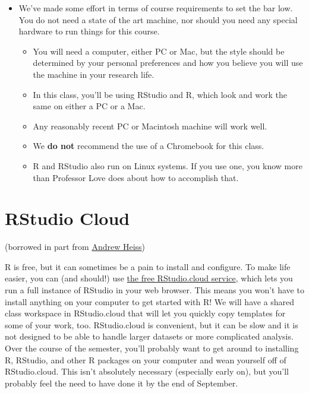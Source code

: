 \documentclass[
]{book}
\providecommand{\tightlist}{%
  \setlength{\itemsep}{0pt}\setlength{\parskip}{0pt}}
\begin{document}
\begin{itemize}
\tightlist
\item
  We've made some effort in terms of course requirements to set the bar low. You do not need a state of the art machine, nor should you need any special hardware to run things for this course.

  \begin{itemize}
  \tightlist
  \item
    You will need a computer, either PC or Mac, but the style should be determined by your personal preferences and how you believe you will use the machine in your research life.
  \item
    In this class, you'll be using RStudio and R, which look and work the same on either a PC or a Mac.
  \item
    Any reasonably recent PC or Macintosh machine will work well.
  \item
    We \textbf{do not} recommend the use of a Chromebook for this class.
  \item
    R and RStudio also run on Linux systems. If you use one, you know more than Professor Love does about how to accomplish that.
  \end{itemize}
\end{itemize}

\hypertarget{rstudio-cloud}{%
\section{RStudio Cloud}\label{rstudio-cloud}}

(borrowed in part from \href{https://evalf19.classes.andrewheiss.com/syllabus/}{Andrew Heiss})

R is free, but it can sometimes be a pain to install and configure. To make life easier, you can (and should!) use \href{http://rstudio.cloud/}{the free RStudio.cloud service}, which lets you run a full instance of RStudio in your web browser. This means you won't have to install anything on your computer to get started with R! We will have a shared class workspace in RStudio.cloud that will let you quickly copy templates for some of your work, too. RStudio.cloud is convenient, but it can be slow and it is not designed to be able to handle larger datasets or more complicated analysis. Over the course of the semester, you'll probably want to get around to installing R, RStudio, and other R packages on your computer and wean yourself off of RStudio.cloud. This isn't absolutely necessary (especially early on), but you'll probably feel the need to have done it by the end of September.
\end{document}
